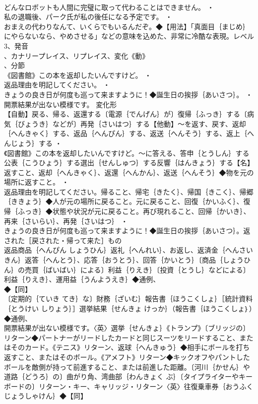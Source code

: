\documentclass[8pt]{extreport}
\begin{document}
\begin{CJK}{UTF8}{min}
\\	どんなロボットも人間に完璧に取って代わることはできません。 ・
\\	私の退職後、パーク氏が私の後任になる予定です。 ・
\\	おまえの代わりなんて、いくらでもいるんだぞ。◆【用法】「真面目｛まじめ｝にやらないなら、やめさせる」などの意味を込めた、非常に冷酷な表現。レベル3、発音
\\	、カナリープレイス、リプレイス、変化《動》
\\	、分節
\\	《図書館》この本を返却したいんですけど。 ・
\\	返品理由を明記してください。 ・
\\	きょうの良き日が何度も巡って来ますように！◆誕生日の挨拶｛あいさつ｝。 ・
\\	開票結果が出ない模様です。	変化形 
\\	【自動】戻る、帰る、返還する〔電源｛でんげん｝が〕復帰｛ふっき｝する〔病気｛びょうき｝などが〕再発｛さいはつ｝する【他動】～を返す、戻す、返却｛へんきゃく｝する、返品｛へんぴん｝する、返送｛へんそう｝する、返上｛へんじょう｝する ・
\\	《図書館》この本を返却したいんですけど。～に答える、答申｛とうしん｝する公表｛こうひょう｝する選出｛せんしゅつ｝する反響｛はんきょう｝する【名】返すこと、返却｛へんきゃく｝、返還｛へんかん｝、返送｛へんそう｝◆物を元の場所に返すこと。 ・
\\	返品理由を明記してください。帰ること、帰宅｛きたく｝、帰国｛きこく｝、帰郷｛ききょう｝◆人が元の場所に戻ること。元に戻ること、回復｛かいふく｝、復帰｛ふっき｝◆状態や状況が元に戻ること。再び現れること、回帰｛かいき｝、再来｛さいらい｝、再発｛さいはつ｝ ・
\\	きょうの良き日が何度も巡って来ますように！◆誕生日の挨拶｛あいさつ｝。返された［戻された・帰って来た］もの
\\	返品商品｛へんぴん しょうひん｝返礼｛へんれい｝、お返し、返済金｛へんさい きん｝返答｛へんとう｝、応答｛おうとう｝、回答｛かいとう｝〔商品｛しょうひん｝の売買｛ばいばい｝による〕利益｛りえき｝〔投資｛とうし｝などによる〕利益｛りえき｝、運用益｛うんようえき｝◆通例、
\\	◆【同】
\\	〔定期的｛ていき てき｝な〕財務｛ざいむ｝報告書｛ほうこくしょ｝［統計資料｛とうけい しりょう｝］選挙結果｛せんきょ けっか｝（報告書｛ほうこくしょ｝）◆通例、
\\	開票結果が出ない模様です。〈英〉選挙｛せんきょ｝《トランプ》〔ブリッジの〕リターン◆パートナーがリードしたカードと同じスーツをリードすること、またはそのカード。《テニス》リターン、返球｛へんきゅう｝◆相手にボールを打ち返すこと、またはそのボール。《アメフト》リターン◆キックオフやパントしたボールを敵側が持って前進すること、または前進した距離。〔河川｛かせん｝や道路｛どうろ｝の〕曲がり角、湾曲部｛わんきょく ぶ｝〔タイプライターやキーボードの〕リターン・キー、キャリッジ・リターン〈英〉往復乗車券｛おうふく じょうしゃけん｝◆【同】

\end{CJK}
\end{document}
